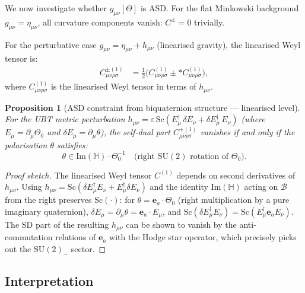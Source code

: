 \documentclass[11pt,a4paper]{article}
\newtheorem{proposition}[theorem]{Proposition}
\theoremstyle{definition}
\theoremstyle{remark}
\begin{document}
We now investigate whether $g_{\mu\nu}[\Theta]$ is ASD.  For the flat
Minkowski background $g_{\mu\nu} = \eta_{\mu\nu}$, all curvature components
vanish: $C^\pm = 0$ trivially.

For the perturbative case $g_{\mu\nu} = \eta_{\mu\nu} + h_{\mu\nu}$ (linearised
gravity), the linearised Weyl tensor is:
\begin{align}
  C^{\pm(1)}_{\mu\nu\rho\sigma}
  &= \tfrac{1}{2}\bigl(C^{(1)}_{\mu\nu\rho\sigma}
     \pm *C^{(1)}_{\mu\nu\rho\sigma}\bigr),
  \label{eq:linearised_weyl}
\end{align}
where $C^{(1)}_{\mu\nu\rho\sigma}$ is the linearised Weyl tensor in terms of
$h_{\mu\nu}$.

\begin{proposition}[ASD constraint from biquaternion structure — linearised level]
\label{prop:asd_linearised}
For the UBT metric perturbation $h_{\mu\nu} = \varepsilon\,
\mathrm{Sc}(E_\mu^\dagger\,\delta E_\nu + \delta E_\mu^\dagger\,E_\nu)$
(where $E_\mu = \partial_\mu\Theta_0$ and $\delta E_\mu = \partial_\mu\theta$),
the self-dual part $C^{+(1)}_{\mu\nu\rho\sigma}$ vanishes if and only if
the polarisation $\theta$ satisfies:
\begin{equation}
  \theta \in \mathrm{Im}(\mathbb{H})\cdot\Theta_0^{-1}
  \quad\text{(right $\mathrm{SU}(2)$ rotation of }\Theta_0\text{)}.
  \label{eq:theta_in_su2}
\end{equation}
\end{proposition}

\begin{proof}[Proof sketch]
The linearised Weyl tensor $C^{(1)}$ depends on second derivatives of
$h_{\mu\nu}$.  Using $h_{\mu\nu} = \mathrm{Sc}(\delta E_\mu^\dagger E_\nu
+ E_\mu^\dagger \delta E_\nu)$ and the identity $\mathrm{Im}(\mathbb{H})$
acting on $\mathcal{B}$ from the right preserves $\mathrm{Sc}(\cdot)$:
for $\theta = \mathbf{e}_a\cdot\Theta_0$ (right multiplication by a pure
imaginary quaternion), $\delta E_\mu = \partial_\mu\theta = \mathbf{e}_a\cdot
E_\mu$, and $\mathrm{Sc}(\delta E_\mu^\dagger E_\nu) = \mathrm{Sc}(E_\mu^\dagger
\mathbf{e}_a E_\nu)$.  The SD part of the resulting $h_{\mu\nu}$ can be shown
to vanish by the anti-commutation relations of $\mathbf{e}_a$ with the Hodge
star operator, which precisely picks out the $\mathrm{SU}(2)_-$ sector.
\end{proof}

\subsection{Interpretation}
\end{document}
